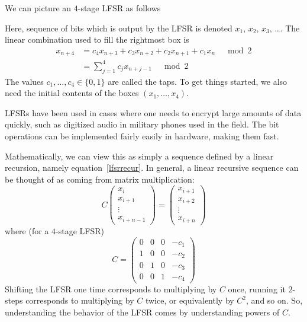 \documentclass[12pt]{amsart}
\theoremstyle{plain}
\theoremstyle{definition}
\theoremstyle{remark}
\begin{document}
We can picture an $4$-stage LFSR as follows


Here, sequence of bits which is output by the LFSR is denoted $x_1$,
$x_2$, $x_3$, \ldots.  The linear combination used to fill the
rightmost box is
\begin{align}
x_{n+4} &= c_4x_{n+3}+c_3 x_{n+2}+c_2 x_{n+1}+ c_1x_n \quad \bmod 2 \label{lfsrrecur}\\
&= \sum_{j=1}^4 c_j x_{n+j-1}\quad \bmod 2
\end{align}
The values $c_1, \ldots, c_4\in\{0,1\}$ are called the taps.  To get
things started, we also need the initial contents of the boxes $(x_1,\ldots, x_4)$.

LFSRs have been used in cases where one needs to encrypt large amounts
of data quickly, such as digitized audio in military phones used in
the field.  The bit operations can be implemented fairly easily in
hardware, making them fast.

Mathematically, we can view this as simply a sequence defined by a
linear recursion, namely equation~\eqref{lfsrrecur}.  In general, a
linear recursive sequence can be thought of as coming from matrix
multiplication:
\[ C 
\begin{pmatrix} x_i \\ x_{i+1} \\ \vdots \\ x_{i+n-1} \end{pmatrix} =
\begin{pmatrix} x_{i+1} \\ x_{i+2} \\ \vdots \\ x_{i+n} \end{pmatrix}
\]
where (for a $4$-stage LFSR)
\[ C = \begin{pmatrix} 0 & 0 & 0 & -c_1 \\
1 & 0  & 0 & -c_2 \\
0 & 1  & 0 & -c_3 \\
0 & 0 & 1 & -c_4 
\end{pmatrix}
\]
Shifting the LFSR one time corresponds to multiplying by $C$ once,
running it $2$-steps corresponds to multiplying by $C$ twice, or
equivalently by $C^2$, and so on.  So, understanding the behavior of
the LFSR comes by understanding powers of $C$.
\end{document}
